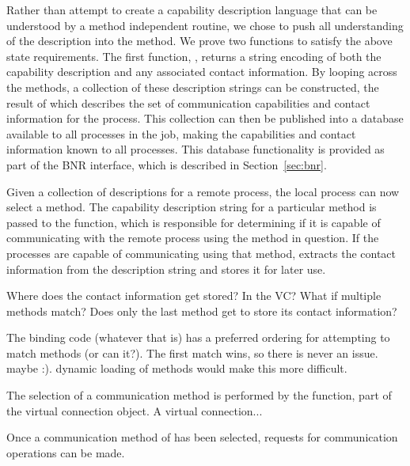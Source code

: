 Rather than attempt to create a capability description language that can be
understood by a method independent routine, we chose to push all understanding
of the description into the method.  We prove two functions to satisfy the
above state requirements.  The first function, ,
returns a string encoding of both the capability description and any associated
contact information.  By looping across the methods, a collection of these
description strings can be constructed, the result of which describes the set
of communication capabilities and contact information for the process.  This
collection can then be published into a database available to all processes in
the job, making the capabilities and contact information known to all
processes.  This database functionality is provided as part of the BNR
interface, which is described in Section~\ref{sec:bnr}.

Given a collection of descriptions for a remote process, the local process can
now select a method.  The capability description string for a particular method
is passed to the  function, which is
responsible for determining if it is capable of communicating with the remote
process using the method in question.  If the processes are capable of
communicating using that method,  extracts the contact
information from the description string and stores it for later use.

\begin{cmt}[BRT]
  Where does the contact information get stored?  In the VC?  What if multiple
  methods match?  Does only the last method get to store its contact
  information?
\end{cmt}

\begin{cmt}[ROB]
  The binding code (whatever that is) has a preferred ordering for attempting
  to match methods (or can it?).  The first match wins, so there is never an
  issue.  maybe :).  dynamic loading of methods would make this more difficult.
\end{cmt}

The selection of a communication method is performed by the
 function, part of the virtual connection object.  A
virtual connection... 

Once a communication method of has been selected, requests for communication
operations can be made.  


